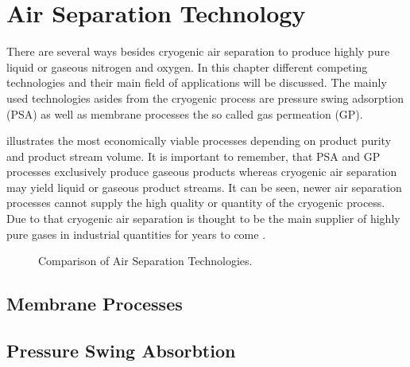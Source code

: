 \chapter{Air Separation Technology}
\label{chp:airsep}
There are several ways besides cryogenic air separation to produce highly pure liquid or gaseous
nitrogen and oxygen. In this chapter different competing technologies and their main field of
applications will be discussed. The mainly used technologies asides from the cryogenic process 
are pressure swing adsorption (PSA) as well as membrane processes the so called gas permeation (GP). 

 illustrates the most economically viable processes depending on product
purity and product stream volume. It is important to remember, that PSA and GP processes exclusively produce 
gaseous products whereas cryogenic air separation may yield liquid or gaseous product streams. 
It can be seen, newer air separation processes cannot supply the high quality or quantity of the cryogenic 
process. Due to that cryogenic air separation is thought to be the main supplier of highly pure gases in 
industrial quantities for years to come \addref.
 
\begin{figure}
	
	\caption{Comparison of Air Separation Technologies.}
	\label{fig:tech_compar}
\end{figure}

\section{Membrane Processes}
\label{sec:membrane}

\section{Pressure Swing Absorbtion}
\label{sec:psa}
